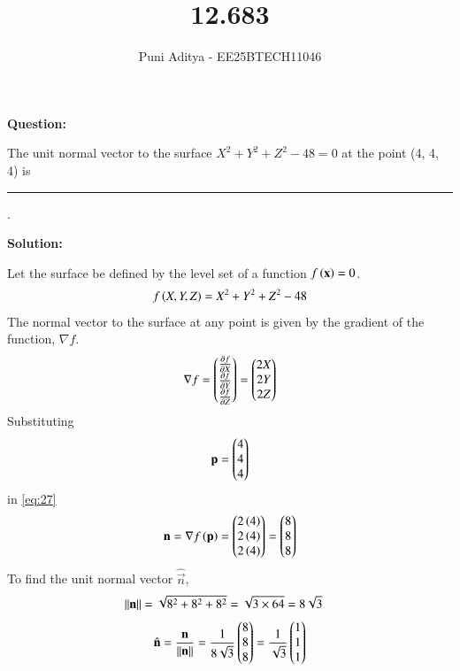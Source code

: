 \documentclass[journal]{IEEEtran}
\begin{document}
\title{12.683}
\author{Puni Aditya - EE25BTECH11046}
\maketitle

\textbf{Question:}

The unit normal vector to the surface $X^2 + Y^2 + Z^2 - 48 = 0$ at the point (4, 4, 4) is \rule{2cm}{0.4pt}.

\textbf{Solution:}

Let the surface be defined by the level set of a function $f\left(\mathbf{x}\right) = 0$.
\begin{align}
    f\left(X, Y, Z\right) = X^2 + Y^2 + Z^2 - 48
\end{align}
The normal vector to the surface at any point is given by the gradient of the function, $\nabla f$.
\begin{align}
    \nabla f = \begin{pmatrix}\frac{\partial f}{\partial X} \\ \frac{\partial f}{\partial Y} \\ \frac{\partial f}{\partial Z}\end{pmatrix} = \begin{pmatrix}2X \\ 2Y \\ 2Z\end{pmatrix} \label{eq:27}
\end{align}
Substituting 
\begin{align}
    \mathbf{p} = \begin{pmatrix}4 \\ 4 \\ 4\end{pmatrix}
\end{align}
in \eqref{eq:27}
\begin{align}
    \mathbf{n} = \nabla f\left(\mathbf{p}\right) = \begin{pmatrix}2\left(4\right) \\ 2\left(4\right) \\ 2\left(4\right)\end{pmatrix} = \begin{pmatrix}8 \\ 8 \\ 8\end{pmatrix}
\end{align}
To find the unit normal vector $\hat{\vec{n}}$,
\begin{align}
    \left\lVert\mathbf{n}\right\rVert &= \sqrt{8^2 + 8^2 + 8^2} = \sqrt{3 \times 64} = 8\sqrt{3}
\end{align}
\begin{align}
    \hat{\mathbf{n}} = \frac{\mathbf{n}}{\left\lVert\mathbf{n}\right\rVert} = \frac{1}{8\sqrt{3}}\begin{pmatrix}8 \\ 8 \\ 8\end{pmatrix} = \frac{1}{\sqrt{3}}\begin{pmatrix}1 \\ 1 \\ 1\end{pmatrix}
\end{align}
\end{document}
